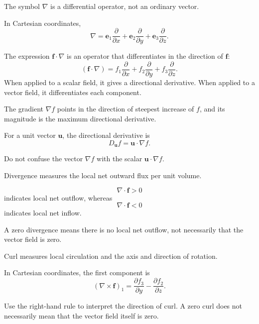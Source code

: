 \begin{mistake}
  The symbol $\nabla$ is a differential operator, not an ordinary vector.

  In Cartesian coordinates,
  \[
  \nabla=
  \boldsymbol{e}_1\frac{\partial}{\partial x}
  +\boldsymbol{e}_2\frac{\partial}{\partial y}
  +\boldsymbol{e}_3\frac{\partial}{\partial z}.
  \]

  The expression $\boldsymbol{f}\cdot\nabla$ is an operator that differentiates in the direction of $\boldsymbol{f}$:
  \[
  (\boldsymbol{f}\cdot\nabla)
  =f_1\frac{\partial}{\partial x}
  +f_2\frac{\partial}{\partial y}
  +f_3\frac{\partial}{\partial z}.
  \]
  When applied to a scalar field, it gives a directional derivative. When applied to a vector field, it differentiates each component.
\end{mistake}

\begin{mistake}
  The gradient $\nabla f$ points in the direction of steepest increase of $f$, and its magnitude is the maximum directional derivative.

  For a unit vector $\boldsymbol{u}$, the directional derivative is
  \[
  D_{\boldsymbol{u}}f=\boldsymbol{u}\cdot\nabla f.
  \]

  Do not confuse the vector $\nabla f$ with the scalar $\boldsymbol{u}\cdot\nabla f$.
\end{mistake}

\begin{mistake}
  Divergence measures the local net outward flux per unit volume.

  \[
  \nabla\cdot\boldsymbol{f}>0
  \]
  indicates local net outflow, whereas
  \[
  \nabla\cdot\boldsymbol{f}<0
  \]
  indicates local net inflow.

  A zero divergence means there is no local net outflow, not necessarily that the vector field is zero.
\end{mistake}

\begin{mistake}
  Curl measures local circulation and the axis and direction of rotation.

  In Cartesian coordinates, the first component is
  \[
  (\nabla\times\boldsymbol{f})_1
  =\frac{\partial f_3}{\partial y}
  -\frac{\partial f_2}{\partial z}.
  \]

  Use the right-hand rule to interpret the direction of curl. A zero curl does not necessarily mean that the vector field itself is zero.
\end{mistake}

